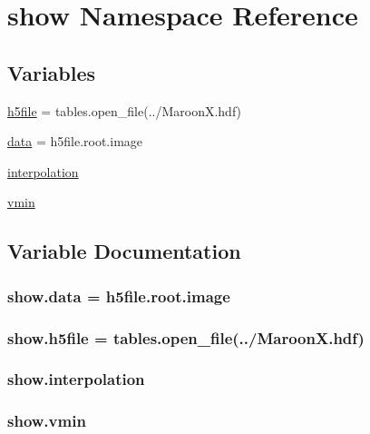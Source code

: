 \hypertarget{namespaceshow}{}\section{show Namespace Reference}
\label{namespaceshow}
\subsection*{Variables}
\begin{DoxyCompactItemize}
\item 
\hyperlink{namespaceshow_a12dc34cfaf2c2f1bf05444c69b8abdf6}{h5file} = tables.\+open\+\_\+file(\textquotesingle{}../Maroon\+X.\+hdf\textquotesingle{})
\item 
\hyperlink{namespaceshow_a529315774e598a211db33058ad7fc0d0}{data} = h5file.\+root.\+image
\item 
\hyperlink{namespaceshow_ab292c4d06df6066a2fed0051e3c747d2}{interpolation}
\item 
\hyperlink{namespaceshow_a8d01a2df620354cf2bab5cf77cca2dee}{vmin}
\end{DoxyCompactItemize}


\subsection{Variable Documentation}
\subsubsection[{\texorpdfstring{data}{data}}]{\setlength{\rightskip}{0pt plus 5cm}show.\+data = h5file.\+root.\+image}\hypertarget{namespaceshow_a529315774e598a211db33058ad7fc0d0}{}\label{namespaceshow_a529315774e598a211db33058ad7fc0d0}
\subsubsection[{\texorpdfstring{h5file}{h5file}}]{\setlength{\rightskip}{0pt plus 5cm}show.\+h5file = tables.\+open\+\_\+file(\textquotesingle{}../Maroon\+X.\+hdf\textquotesingle{})}\hypertarget{namespaceshow_a12dc34cfaf2c2f1bf05444c69b8abdf6}{}\label{namespaceshow_a12dc34cfaf2c2f1bf05444c69b8abdf6}
\subsubsection[{\texorpdfstring{interpolation}{interpolation}}]{\setlength{\rightskip}{0pt plus 5cm}show.\+interpolation}\hypertarget{namespaceshow_ab292c4d06df6066a2fed0051e3c747d2}{}\label{namespaceshow_ab292c4d06df6066a2fed0051e3c747d2}
\subsubsection[{\texorpdfstring{vmin}{vmin}}]{\setlength{\rightskip}{0pt plus 5cm}show.\+vmin}\hypertarget{namespaceshow_a8d01a2df620354cf2bab5cf77cca2dee}{}\label{namespaceshow_a8d01a2df620354cf2bab5cf77cca2dee}
